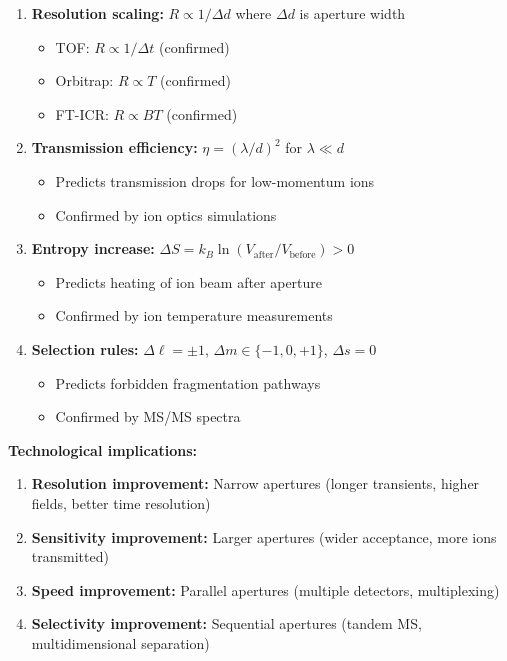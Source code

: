 \begin{enumerate}
    \item \textbf{Resolution scaling:} $R \propto 1/\Delta d$ where $\Delta d$ is aperture width
    \begin{itemize}
        \item TOF: $R \propto 1/\Delta t$ (confirmed)
        \item Orbitrap: $R \propto T$ (confirmed)
        \item FT-ICR: $R \propto BT$ (confirmed)
    \end{itemize}

    \item \textbf{Transmission efficiency:} $\eta = (\lambda/d)^2$ for $\lambda \ll d$
    \begin{itemize}
        \item Predicts transmission drops for low-momentum ions
        \item Confirmed by ion optics simulations
    \end{itemize}

    \item \textbf{Entropy increase:} $\Delta S = k_B \ln(V_{\text{after}}/V_{\text{before}}) > 0$
    \begin{itemize}
        \item Predicts heating of ion beam after aperture
        \item Confirmed by ion temperature measurements
    \end{itemize}

    \item \textbf{Selection rules:} $\Delta\ell = \pm 1$, $\Delta m \in \{-1,0,+1\}$, $\Delta s = 0$
    \begin{itemize}
        \item Predicts forbidden fragmentation pathways
        \item Confirmed by MS/MS spectra
    \end{itemize}
\end{enumerate}

\textbf{Technological implications:}

\begin{enumerate}
    \item \textbf{Resolution improvement:} Narrow apertures (longer transients, higher fields, better time resolution)

    \item \textbf{Sensitivity improvement:} Larger apertures (wider acceptance, more ions transmitted)

    \item \textbf{Speed improvement:} Parallel apertures (multiple detectors, multiplexing)

    \item \textbf{Selectivity improvement:} Sequential apertures (tandem MS, multidimensional separation)
\end{enumerate}


